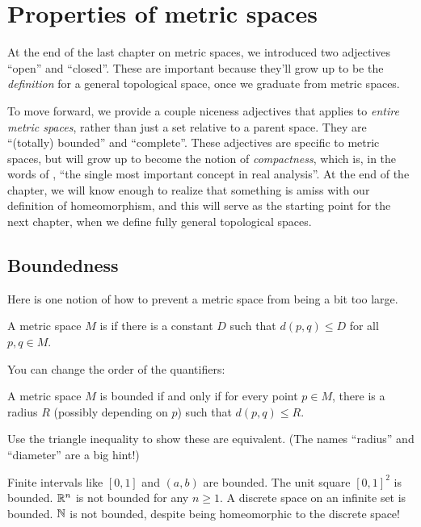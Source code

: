 \chapter{Properties of metric spaces}
At the end of the last chapter on metric spaces,
we introduced two adjectives ``open'' and ``closed''.
These are important because they'll grow up
to be the \emph{definition} for a general topological space,
once we graduate from metric spaces.

To move forward, we provide a couple niceness adjectives
that applies to \emph{entire metric spaces},
rather than just a set relative to a parent space.
They are ``(totally) bounded'' and ``complete''.
These adjectives are specific to metric spaces,
but will grow up to become the notion of \emph{compactness},
which is, in the words of \cite{ref:pugh},
``the single most important concept in real analysis''.
At the end of the chapter,
we will know enough to realize that something is amiss
with our definition of homeomorphism,
and this will serve as the starting point for the next chapter,
when we define fully general topological spaces.

\section{Boundedness}
Here is one notion of how to prevent a metric space
from being a bit too large.

\begin{definition}
	A metric space $M$ is 
	if there is a constant $D$ such that $d(p,q) \le D$ for all $p,q \in M$.
\end{definition}
You can change the order of the quantifiers:
\begin{proposition}
	A metric space $M$ is bounded if and only if
	for every point $p \in M$, there is a radius $R$
	(possibly depending on $p$) such that $d(p,q) \le R$.
\end{proposition}
\begin{exercise}
	Use the triangle inequality to show these are equivalent.
	(The names ``radius'' and ``diameter'' are a big hint!)
\end{exercise}

\begin{example}
	\listhack
	\begin{enumerate}[(a)]
		\ii Finite intervals like $[0,1]$ and $(a,b)$ are bounded.
		\ii The unit square $[0,1]^2$ is bounded.
		\ii $\mathbb R^n$ is not bounded for any $n \ge 1$.
		\ii A discrete space on an infinite set is bounded.
		\ii $\mathbb N$ is not bounded, despite being
		homeomorphic to the discrete space!
	\end{enumerate}
\end{example}

